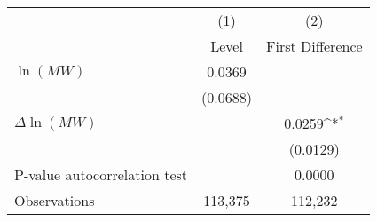 {
\def\sym#1{\ifmmode^{#1}\else\(^{#1}\)\fi}
\begin{tabular}{l*{2}{c}}
\hline\hline
          &\multicolumn{1}{c}{(1)}&\multicolumn{1}{c}{(2)}\\
          &\multicolumn{1}{c}{Level}&\multicolumn{1}{c}{First Difference}\\
\hline
$\ln(MW)$ &   0.0369         &                  \\
          & (0.0688)         &                  \\
[1em]
$\Delta\ln(MW)$&                  &   0.0259\sym{*}  \\
          &                  & (0.0129)         \\
\hline
P-value autocorrelation test&                  &   0.0000         \\
Observations&  113,375         &  112,232         \\
\hline\hline
\end{tabular}
}
